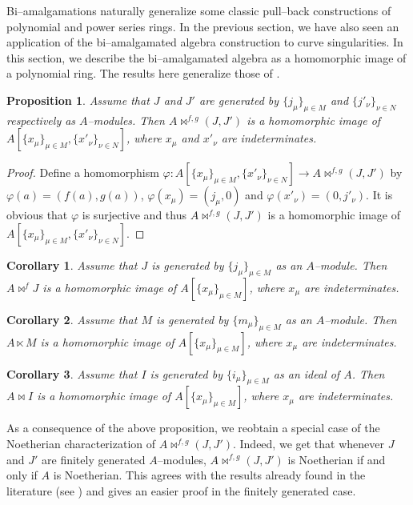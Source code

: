 \documentclass{amsart}%
\theoremstyle{plain}
\newtheorem{corollary}{Corollary}[section]
\newtheorem{proposition}{Proposition}[section]
\numberwithin{equation}{section}
\theoremstyle{definition}
\begin{document}
Bi--amalgamations naturally generalize some classic pull--back constructions of polynomial and power series rings. In the previous section, we have also seen an application of the bi--amalgamated algebra construction to curve singularities. In this section, we describe the bi--amalgamated algebra as a homomorphic image of a polynomial ring. The results here generalize those of \cite{iranlilar}.

\begin{proposition}\label{homimageprop}
    Assume that $J$ and $J'$ are generated by $\{j_\mu\}_{\mu\in M}$ and $\{j'_\nu\}_{\nu\in N}$ respectively as $A$--modules. Then $A\bowtie^{f,g}(J,J')$ is a homomorphic image of $A[\{x_\mu\}_{\mu\in M}, \{x'_\nu\}_{\nu\in N}]$, where $x_\mu$ and $x'_\nu$ are indeterminates.
\end{proposition}
\begin{proof}
    Define a homomorphism $\varphi:A[\{x_\mu\}_{\mu\in M}, \{x'_\nu\}_{\nu\in N}]\to A\bowtie^{f,g}(J,J')$ by $\varphi(a)=(f(a),g(a))$, $\varphi(x_\mu)=(j_\mu,0)$ and $\varphi(x'_\nu)=(0,j'_\nu)$. It is obvious that $\varphi$ is surjective and thus $A\bowtie^{f,g}(J,J')$ is a homomorphic image of $A[\{x_\mu\}_{\mu\in M}, \{x'_\nu\}_{\nu\in N}]$.
\end{proof}
\begin{corollary}
    Assume that $J$ is generated by $\{j_\mu\}_{\mu\in M}$ as an $A$--module. Then $A\bowtie^{f}J$ is a homomorphic image of $A[\{x_\mu\}_{\mu\in M}]$, where $x_\mu$ are indeterminates.
\end{corollary}
\begin{corollary}
    Assume that $M$ is generated by $\{m_\mu\}_{\mu\in M}$ as an $A$--module. Then $A\ltimes M$ is a homomorphic image of $A[\{x_\mu\}_{\mu\in M}]$, where $x_\mu$ are indeterminates.
\end{corollary}
\begin{corollary}
    Assume that $I$ is generated by $\{i_\mu\}_{\mu\in M}$ as an ideal of $A$. Then $A\bowtie I$ is a homomorphic image of $A[\{x_\mu\}_{\mu\in M}]$, where $x_\mu$ are indeterminates.
\end{corollary}

As a consequence of the above proposition, we reobtain a special case of the Noetherian characterization of $A\bowtie^{f,g}(J,J')$. Indeed, we get that whenever $J$ and $J'$ are finitely generated $A$--modules, $A\bowtie^{f,g}(J,J')$ is Noetherian if and only if $A$ is Noetherian. This agrees with the results already found in the literature (see \cite{KLT}) and gives an easier proof in the finitely generated case.\medskip
\end{document}
